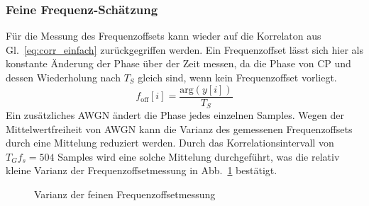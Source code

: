 \subsubsection{Feine Frequenz-Schätzung}
Für die Messung des Frequenzoffsets kann wieder auf die Korrelaton aus Gl.~\ref{eq:corr_einfach} zurückgegriffen werden. Ein Frequenzoffset lässt sich hier als konstante Änderung der Phase über der Zeit messen, da die Phase von \ac{CP} und dessen Wiederholung nach $T_S$ gleich sind, wenn kein Frequenzoffset vorliegt. 
\begin{equation}
f_{\text{off}}[i] = \frac{\text{arg}(y[i])}{T_S}
\label{eq:fine_frequency_estimation}
\end{equation}
Ein zusätzliches \ac{AWGN} ändert die Phase jedes einzelnen Samples. Wegen der Mittelwertfreiheit von \ac{AWGN} kann die Varianz des gemessenen Frequenzoffsets durch eine Mittelung reduziert werden.
Durch das Korrelationsintervall von $T_G f_s = 504$ Samples wird eine solche Mittelung durchgeführt, was die relativ kleine Varianz der Frequenzoffsetmessung in Abb.~\ref{plot:varianz_freq_offset} bestätigt.
\begin{figure}[htb]
\begin{center}
\end{center}
\caption{Varianz der feinen Frequenzoffsetmessung}
\label{plot:varianz_freq_offset}
\end{figure}

